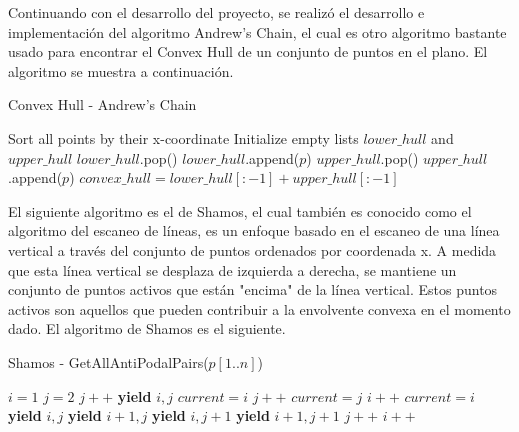 \documentclass[conference]{IEEEtran}
\begin{document}
Continuando con el desarrollo del proyecto, se realizó el desarrollo e implementación del algoritmo Andrew’s Chain, el cual es otro algoritmo bastante usado para encontrar el Convex Hull de un conjunto de puntos en el plano. El algoritmo se muestra a continuación.

\begin{algorithm}
\caption{Convex Hull - Andrew's Chain}
\begin{algorithmic}[1]
\STATE Sort all points by their x-coordinate
\STATE Initialize empty lists $lower\_hull$ and $upper\_hull$
        \STATE $lower\_hull$.pop()
    \ENDWHILE
    \STATE $lower\_hull$.append($p$)
\ENDFOR
{}
        \STATE $upper\_hull$.pop()
    \ENDWHILE
    \STATE $upper\_hull$.append($p$)
\ENDFOR
\STATE $convex\_hull = lower\_hull[:-1] + upper\_hull[:-1]$
\end{algorithmic}
\end{algorithm}

El siguiente algoritmo es el de Shamos, el cual también es conocido como el algoritmo del escaneo de líneas, es un enfoque basado en el escaneo de una línea vertical a través del conjunto de puntos ordenados por coordenada x. A medida que esta línea vertical se desplaza de izquierda a derecha, se mantiene un conjunto de puntos activos que están "encima" de la línea vertical. Estos puntos activos son aquellos que pueden contribuir a la envolvente convexa en el momento dado. El algoritmo de Shamos es el siguiente.

\begin{algorithm}
\caption{Shamos - GetAllAntiPodalPairs($p[1..n]$)}
\begin{algorithmic}[1]
\STATE $i = 1$
\STATE $j = 2$
    \STATE $j++$
\ENDWHILE
\STATE \textbf{yield} $i, j$
\STATE $current = i$
        \STATE $j++$
        \STATE $current = j$
    \ELSE
        \STATE $i++$
        \STATE $current = i$
    \ENDIF
    \STATE \textbf{yield} $i, j$
        \STATE \textbf{yield} $i + 1, j$
        \STATE \textbf{yield} $i, j + 1$
        \STATE \textbf{yield} $i + 1, j + 1$
            \STATE $j++$
        \ELSE
            \STATE $i++$
        \ENDIF
    \ENDIF
\ENDWHILE
\end{algorithmic}
\end{algorithm}
\end{document}

